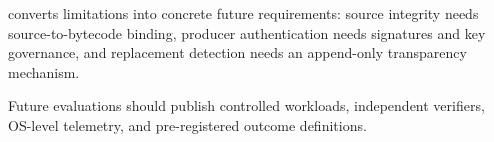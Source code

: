 \begin{table}[t]
\centering
\caption{Limitations and future assurance requirements. These are excluded
from current claims unless the required mechanism and evaluation are added.}
\label{tab:limitations-assurance}

\end{table}

 converts limitations into concrete future
requirements: source integrity needs source-to-bytecode binding, producer
authentication needs signatures and key governance, and replacement detection
needs an append-only transparency mechanism.

Future evaluations should publish controlled workloads, independent
verifiers, OS-level telemetry, and pre-registered outcome definitions.
